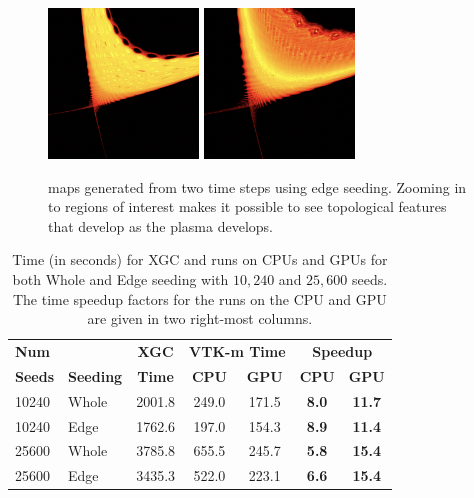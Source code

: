 \begin{figure}[ht]
 \centering
 \includegraphics[width=40mm]{figures/poincare-X.1.png}
 \includegraphics[width=40mm]{figures/poincare-X.2.png}

\caption{\poincare maps generated from two time steps using edge seeding. Zooming in to regions of interest makes it possible to see topological features that develop as the plasma develops.}
\vspace{-5pt}
\label{fig:result}
\end{figure}








\begin{table}[]
\centering
\caption{Time (in seconds) for XGC and \vtkm runs on CPUs and GPUs for both Whole and Edge seeding with $10,240$ and $25,600$ seeds. The time speedup factors for the \vtkm runs on the CPU and GPU are given in two right-most columns.}
\label{table:timingResults}
\begin{tabular}{ll|c|cc|cc}
\hline
\textbf{Num} & \multicolumn{1}{c|}{} & \textbf{XGC} & \multicolumn{2}{c|}{\textbf{VTK-m Time}} & \multicolumn{2}{c}{\textbf{Speedup}} \\
\textbf{Seeds} & \textbf{Seeding} & \textbf{Time} & \textbf{CPU} & \textbf{GPU} & \textbf{CPU} & \textbf{GPU} \\ \hline \hline
10240 & Whole & 2001.8 & 249.0 & 171.5 & \textbf{8.0} & \textbf{11.7} \\
10240 & Edge & 1762.6 & 197.0 & 154.3 & \textbf{8.9} & \textbf{11.4} \\
25600 & Whole & 3785.8 & 655.5 & 245.7 & \textbf{5.8} & \textbf{15.4} \\
25600 & Edge & 3435.3 & 522.0 & 223.1 & \textbf{6.6} & \textbf{15.4} \\ \hline
\end{tabular}
\end{table}


